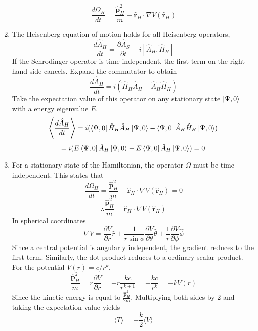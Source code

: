 \begin{sol}
\begin{enumerate}[label=\textbf{(\alph*)}]
$$\frac{d\Omega_H}{dt}=\frac{\hat{\mathbf p}_H^2}{m}-\hat {\mathbf r}_H\cdot\nabla V(\hat {\mathbf r}_H)$$ 
\item
The Heisenberg equation of motion holds for all Heisenberg operators, 
$$\frac{d\hat A_H}{dt}=\frac{\partial \hat A_S}{\partial t}-i[\hat A_H,\hat H_H]$$
If the Schrodinger operator is time-independent, the first term on the right hand side cancels. Expand the commutator to obtain
$$\frac{d\hat A_H}{dt}=i(\hat H_H\hat A_H-\hat A_H\hat H_H)$$ 
Take the expectation value of this operator on any stationary state $\ket{\Psi,0}$ with a energy eigenvalue $E$.
$$\left\langle\frac{d\hat A_H}{dt}\right\rangle=i(\bra{\Psi,0}\hat H_H\hat A_H\ket{\Psi,0}-\bra{\Psi,0}\hat A_H\hat H_H\ket{\Psi,0})$$$$=i(E\bra{\Psi,0}\hat A_H\ket{\Psi,0}-E\bra{\Psi,0}\hat A_H\ket{\Psi,0})=0$$
\item
For a stationary state of the Hamiltonian, the operator $\Omega$ must be time independent. This states that
$$\frac{d\Omega_H}{dt}=\frac{\hat{\mathbf p}_H^2}{m}-\hat {\mathbf r}_H\cdot\nabla V(\hat {\mathbf r}_H)=0$$ 
$$\therefore\frac{\hat{\mathbf p}_H^2}{m}=\hat {\mathbf r}_H\cdot\nabla V(\hat {\mathbf r}_H)$$
In spherical coordinates
$$\nabla V=\frac{\partial V}{\partial r}\hat r+\frac{1}{r\sin\phi}\frac{\partial V}{\partial\theta}\hat\theta+\frac{1}{r}\frac{\partial V}{\partial\phi}\hat\phi$$
Since a central potential is angularly independent, the gradient reduces to the first term. Similarly, the dot product reduces to a ordinary scalar product. For the potential $V(r)=c/r^k$,
$$\frac{\hat{\mathbf p}_H^2}{m}=r\frac{\partial V}{\partial r}=-r\frac{kc}{r^{k+1}}=-\frac{kc}{r^k}=-kV(r)$$  
Since the kinetic energy is equal to $\frac{\hat{\mathbf p}_H^2}{2m}$. Multiplying both sides by 2 and taking the expectation value yields
$$\langle T\rangle=-\frac{k}{2}\langle V\rangle$$

\end{enumerate}
\end{sol}